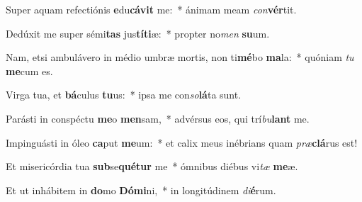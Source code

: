\item Super aquam refectiónis \textbf{e}du\textbf{cá}\textbf{vit} me:~* ánimam meam \textit{con}\textbf{vér}tit.
\item Dedúxit me super sémi\textbf{tas} jus\textbf{tí}\textbf{ti}æ:~* propter no\textit{men} \textbf{su}um.
\item Nam, etsi ambulávero in médio umbræ mortis, non ti\textbf{mé}bo \textbf{ma}la:~* quóniam \textit{tu} \textbf{me}cum es.
\item Virga tua, et \textbf{bá}culus \textbf{tu}us:~* ipsa me con\textit{so}\textbf{lá}ta sunt.
\item Parásti in conspéctu \textbf{me}o \textbf{men}sam,~* advérsus eos, qui trí\textit{bu}\textbf{lant} me.
\item Impinguásti in óleo \textbf{ca}put \textbf{me}um:~* et calix meus inébrians quam \textit{præ}\textbf{clá}rus est!
\item Et misericórdia tua \textbf{sub}se\textbf{qué}\textbf{tur} me~* ómnibus diébus vi\textit{tæ} \textbf{me}æ.
\item Et ut inhábitem in \textbf{do}mo \textbf{Dó}\textbf{mi}ni,~* in longitúdinem \textit{di}\textbf{é}rum.
